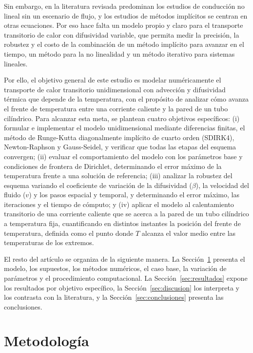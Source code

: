\documentclass[final,5p,times,twocolumn,authoryear,11pt]{elsarticle}
\begin{document}
Sin embargo, en la literatura revisada predominan los estudios de conducción no lineal sin un escenario de flujo, y los estudios de métodos implícitos se centran en otras ecuaciones. Por eso hace falta un modelo propio y claro para el transporte transitorio de calor con difusividad variable, que permita medir la precisión, la robustez y el costo de la combinación de un método implícito para avanzar en el tiempo, un método para la no linealidad y un método iterativo para sistemas lineales.

Por ello, el objetivo general de este estudio es modelar numéricamente el transporte de calor transitorio unidimensional con advección y difusividad térmica que depende de la temperatura, con el propósito de analizar cómo avanza el frente de temperatura entre una corriente caliente y la pared de un tubo cilíndrico. Para alcanzar esta meta, se plantean cuatro objetivos específicos: (i) formular e implementar el modelo unidimensional mediante diferencias finitas, el método de Runge-Kutta diagonalmente implícito de cuarto orden (SDIRK4), Newton-Raphson y Gauss-Seidel, y verificar que todas las etapas del esquema convergen; (ii) evaluar el comportamiento del modelo con los parámetros base y condiciones de frontera de Dirichlet, determinando el error máximo de la temperatura frente a una solución de referencia; (iii) analizar la robustez del esquema variando el coeficiente de variación de la difusividad ($\beta$), la velocidad del fluido ($v$) y los pasos espacial y temporal, y determinando el error máximo, las iteraciones y el tiempo de cómputo; y (iv) aplicar el modelo al calentamiento transitorio de una corriente caliente que se acerca a la pared de un tubo cilíndrico a temperatura fija, cuantificando en distintos instantes la posición del frente de temperatura, definida como el punto donde $T$ alcanza el valor medio entre las temperaturas de los extremos.

El resto del artículo se organiza de la siguiente manera. La Sección~\ref{sec:metodologia} presenta el modelo, los supuestos, los métodos numéricos, el caso base, la variación de parámetros y el procedimiento computacional. La Sección~\ref{sec:resultados} expone los resultados por objetivo específico, la Sección~\ref{sec:discusion} los interpreta y los contrasta con la literatura, y la Sección~\ref{sec:conclusiones} presenta las conclusiones.

\section{Metodología}
\label{sec:metodologia}
\end{document}
